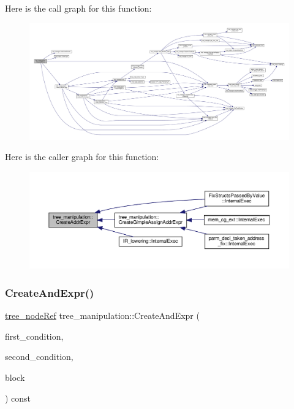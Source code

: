 Here is the call graph for this function\+:
\nopagebreak
\begin{figure}[H]
\begin{center}
\leavevmode
\includegraphics[width=350pt]{d0/d99/classtree__manipulation_a6068b421c1c225d1f7cc01cb354b950d_cgraph}
\end{center}
\end{figure}
Here is the caller graph for this function\+:
\nopagebreak
\begin{figure}[H]
\begin{center}
\leavevmode
\includegraphics[width=350pt]{d0/d99/classtree__manipulation_a6068b421c1c225d1f7cc01cb354b950d_icgraph}
\end{center}
\end{figure}
\mbox{\label{classtree__manipulation_a42828d578db679bde71a5bbaed66ee15}} 
\subsubsection{\texorpdfstring{Create\+And\+Expr()}{CreateAndExpr()}}
{\footnotesize\ttfamily \hyperlink{tree__node_8hpp_a6ee377554d1c4871ad66a337eaa67fd5}{tree\+\_\+node\+Ref} tree\+\_\+manipulation\+::\+Create\+And\+Expr (\begin{DoxyParamCaption}\item[{const \hyperlink{tree__node_8hpp_a3cf5d02292c940f3892425a5b5fdec3c}{tree\+\_\+node\+Const\+Ref} \&}]{first\+\_\+condition,  }\item[{const \hyperlink{tree__node_8hpp_a3cf5d02292c940f3892425a5b5fdec3c}{tree\+\_\+node\+Const\+Ref} \&}]{second\+\_\+condition,  }\item[{const bloc\+Ref \&}]{block }\end{DoxyParamCaption}) const}



